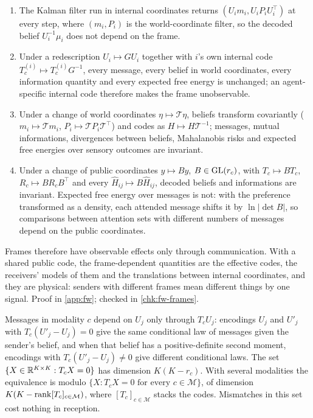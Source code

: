 \begin{proposition}\label{prop:fw-frame-covariance}
\begin{enumerate}
\item[(a)] The Kalman filter run in internal coordinates returns $(U_im_i,U_iP_iU_i^\top)$ at every step, where $(m_i,P_i)$ is the world-coordinate filter, so the decoded belief $U_i^{-1}\mu_i$ does not depend on the frame.
\item[(b)] Under a redescription $U_i\mapsto GU_i$ together with $i$'s own internal code $T^{(i)}_c\mapsto T^{(i)}_cG^{-1}$, every message, every belief in world coordinates, every information quantity and every expected free energy is unchanged; an agent-specific internal code therefore makes the frame unobservable.
\item[(c)] Under a change of world coordinates $\eta\mapsto\mathcal T\eta$, beliefs transform covariantly ($m_i\mapsto\mathcal Tm_i$, $P_i\mapsto\mathcal TP_i\mathcal T^\top$) and codes as $H\mapsto H\mathcal T^{-1}$; messages, mutual informations, divergences between beliefs, Mahalanobis risks and expected free energies over sensory outcomes are invariant.
\item[(d)] Under a change of public coordinates $y\mapsto By$, $B\in\mathrm{GL}(r_c)$, with $T_c\mapsto BT_c$, $R_c\mapsto BR_cB^\top$ and every $\hat H_{ij}\mapsto B\hat H_{ij}$, decoded beliefs and informations are invariant. Expected free energy over messages is not: with the preference transformed as a density, each attended message shifts it by $\ln\lvert\det B\rvert$, so comparisons between attention sets with different numbers of messages depend on the public coordinates.
\end{enumerate}
\end{proposition}

Frames therefore have observable effects only through communication. With a shared public code, the frame-dependent quantities are the effective codes, the receivers' models of them and the translations between internal coordinates, and they are physical: senders with different frames mean different things by one signal. Proof in \cref{app:fw}; checked in \cref{chk:fw-frames}.

\begin{proposition}\label{prop:fw-frame-identifiability}
Messages in modality $c$ depend on $U_j$ only through $T_cU_j$: encodings $U_j$ and $U'_j$ with $T_c(U'_j-U_j)=0$ give the same conditional law of messages given the sender's belief, and when that belief has a positive-definite second moment, encodings with $T_c(U'_j-U_j)\neq0$ give different conditional laws. The set $\{X\in\mathbb{R}^{K\times K}:T_cX=0\}$ has dimension $K(K-r_c)$. With several modalities the equivalence is modulo $\{X:T_cX=0\text{ for every }c\in\mathcal M\}$, of dimension $K(K-\operatorname{rank}[T_c]_{c\in\mathcal M})$, where $[T_c]_{c\in\mathcal M}$ stacks the codes. Mismatches in this set cost nothing in reception.
\end{proposition}

